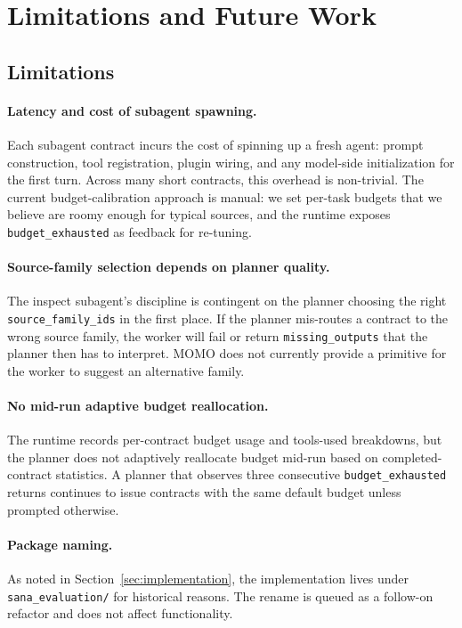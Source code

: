 \section{Limitations and Future Work}
\label{sec:limitations}

\subsection{Limitations}

\paragraph{Latency and cost of subagent spawning.} Each subagent contract incurs the cost of spinning up a fresh agent: prompt construction, tool registration, plugin wiring, and any model-side initialization for the first turn. Across many short contracts, this overhead is non-trivial. The current budget-calibration approach is manual: we set per-task budgets that we believe are roomy enough for typical sources, and the runtime exposes \texttt{budget\_exhausted} as feedback for re-tuning.

\paragraph{Source-family selection depends on planner quality.} The inspect subagent's discipline is contingent on the planner choosing the right \texttt{source\_family\_ids} in the first place. If the planner mis-routes a contract to the wrong source family, the worker will fail or return \texttt{missing\_outputs} that the planner then has to interpret. MOMO does not currently provide a primitive for the worker to suggest an alternative family.

\paragraph{No mid-run adaptive budget reallocation.} The runtime records per-contract budget usage and tools-used breakdowns, but the planner does not adaptively reallocate budget mid-run based on completed-contract statistics. A planner that observes three consecutive \texttt{budget\_exhausted} returns continues to issue contracts with the same default budget unless prompted otherwise.

\paragraph{Package naming.} As noted in Section~\ref{sec:implementation}, the implementation lives under \texttt{sana\_evaluation/} for historical reasons. The rename is queued as a follow-on refactor and does not affect functionality.


